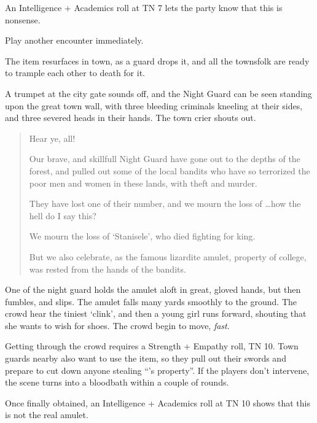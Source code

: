 \begin{multicols}{2}
An Intelligence + Academics roll at TN 7 lets the party know that this is nonsense.

Play another encounter immediately.


The item resurfaces in town, as a guard drops it, and all the townsfolk are ready to trample each other to death for it.

\begin{boxtext}

	A trumpet at the city gate sounds off, and the Night Guard can be seen standing upon the great town wall, with three bleeding criminals kneeling at their sides, and three severed heads in their hands.  The town crier shouts out.

	\begin{quotation}
		Hear ye, all!

		Our brave, and skillfull Night Guard have gone out to the depths of the forest, and pulled out some of the local bandits who have so terrorized the poor men and women in these lands, with theft and murder.

		They have lost one of their number, and we mourn the loss of \ldots how the hell do I say this?

		We mourn the loss of `Stanisele', who died fighting for \gls{king}.

		But we also celebrate, as the famous lizardite amulet, property of \gls{college}, was rested from the hands of the bandits.

	\end{quotation}

	One of the night guard holds the amulet aloft in great, gloved hands, but then fumbles, and slips.  The amulet falls many yards smoothly to the ground.  The crowd hear the tiniest `clink', and then a young girl runs forward, shouting that she wants to wish for shoes.  The crowd begin to move, \emph{fast}.

\end{boxtext}

Getting through the crowd requires a Strength + Empathy roll, TN 10.
Town guards nearby also want to use the item, so they pull out their swords and prepare to cut down anyone stealing ``'s property''.
If the players don't intervene, the scene turns into a bloodbath within a couple of rounds.

Once finally obtained, an Intelligence + Academics roll at TN 10 shows that this is not the real amulet.


\end{multicols}
